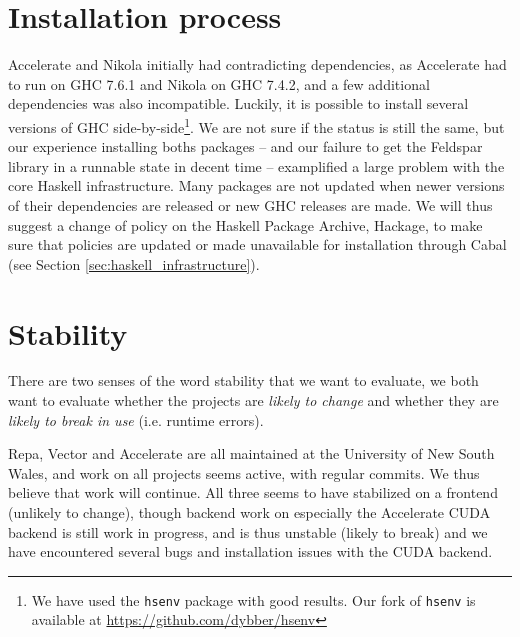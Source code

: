 \section{Installation process}




Accelerate and Nikola initially had contradicting dependencies, as
Accelerate had to run on GHC 7.6.1 and Nikola on GHC 7.4.2, and a few
additional dependencies was also incompatible. Luckily, it is possible
to install several versions of GHC side-by-side\footnote{We have used
  the \texttt{hsenv} package with good results. Our fork of
  \texttt{hsenv} is available at
  \url{https://github.com/dybber/hsenv}}. We are not sure if the
status is still the same, but our experience installing boths packages
-- and our failure to get the Feldspar library in a runnable state in
decent time -- examplified a large problem with the core Haskell
infrastructure. Many packages are not updated when newer versions of
their dependencies are released or new GHC releases are made. We will
thus suggest a change of policy on the Haskell Package Archive,
Hackage, to make sure that policies are updated or made unavailable
for installation through Cabal (see Section
\ref{sec:haskell_infrastructure}).


\section{Stability}

There are two senses of the word stability that we want to evaluate,
we both want to evaluate whether the projects are \emph{likely to
  change} and whether they are \emph{likely to break in use}
(i.e. runtime errors).

Repa, Vector and Accelerate are all maintained at the University of
New South Wales, and work on all projects seems active, with regular
commits. We thus believe that work will continue. All three seems to
have stabilized on a frontend (unlikely to change), though backend
work on especially the Accelerate CUDA backend is still work in
progress, and is thus unstable (likely to break) and we have
encountered several bugs and installation issues with the CUDA
backend.

